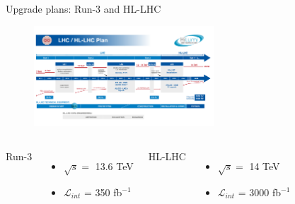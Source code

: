 \begin{frame}{Upgrade plans: Run-3 and HL-LHC}
    \begin{figure}
        \centering
        \includegraphics[width=0.6\textwidth]{Part2/Img/HL-LHC-plan-2021-1.pdf}
    \end{figure}
\begin{columns}
\begin{center}
    Run-3
\end{center}
\begin{itemize}
    \item $\sqrt{s}=$ 13.6 TeV
    \item $\mathcal{L}_{int}$ = 350 fb$^{-1}$
\end{itemize}

\begin{center}
    HL-LHC
\end{center}
\begin{itemize}
    \item $\sqrt{s}=$ 14 TeV
    \item $\mathcal{L}_{int}$ = 3000 fb$^{-1}$
\end{itemize}

\end{columns}
\end{frame}



